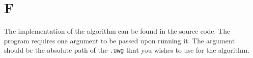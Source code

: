 \section{F}
The implementation of the algorithm can be found in the source code. The program requires one argument to be passed upon running it. The argument should be the absolute path of the \verb=.uwg= that you wishes to use for the algorithm.